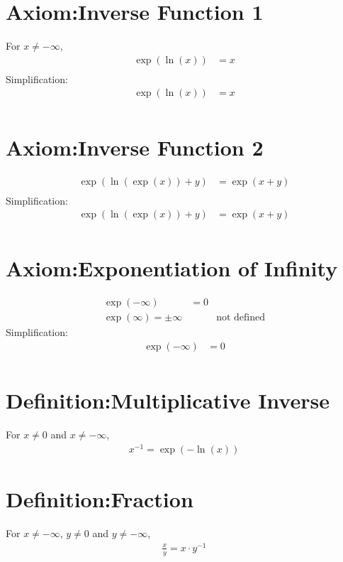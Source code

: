 \documentclass[12pt,a4paper]{report}
\begin{document}
\section{Axiom:Inverse Function 1}
\label{Axiom:Inverse_Function_1}
For $x \neq -\infty$,
\begin{align*}
\exp (\ln (x)) &= x \\
\end{align*}
Simplification:
\begin{align*}
\exp (\ln (x)) &= x \\
\end{align*}

\section{Axiom:Inverse Function 2}
\label{Axiom:Inverse_Function_2}
\begin{align*}
\exp (\ln (\exp (x)) + y) &= \exp(x + y) \\
\end{align*}
Simplification:
\begin{align*}
\exp (\ln (\exp (x)) + y) &= \exp(x + y) \\
\end{align*}

\section{Axiom:Exponentiation of Infinity}
\label{Axiom:Exponentiation_of_Infinity}
\begin{align*}
\exp (-\infty) &= 0 \\
\exp (\infty) = \pm \infty && \text{not defined}
\end{align*}
Simplification:
\begin{align*}
\exp (-\infty) &= 0 \\
\end{align*}

\section{Definition:Multiplicative Inverse}
\label{Definition:Multiplicative_Inverse}
For $x \neq 0$ and $x \neq -\infty$,
\begin{align*}
x^{-1} = \exp(-\ln(x))
\end{align*}

\section{Definition:Fraction}
\label{Definition:Fraction}
For $x \neq -\infty$, $y \neq 0$ and $y \neq -\infty$,
\begin{align*}
\frac{x}{y} = x \cdot y^{-1}
\end{align*}
\end{document}
